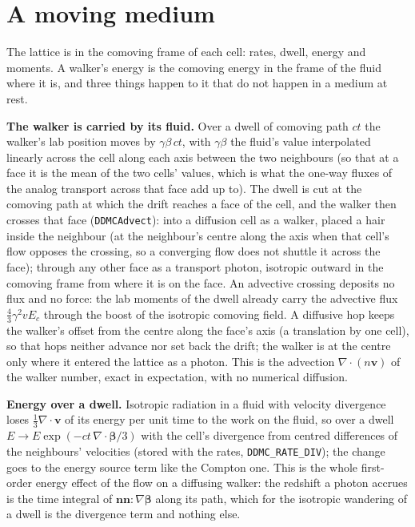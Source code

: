 \documentclass[11pt]{article}
\begin{document}
\section{A moving medium}
\label{sec:moving}

The lattice is in the comoving frame of each cell: rates, dwell, energy and moments.
A walker's energy is the comoving energy in the frame of the fluid where it is, and
three things happen to it that do not happen in a medium at rest.

\textbf{The walker is carried by its fluid.}  Over a dwell of comoving path $ct$ the
walker's lab position moves by $\gamma\beta\,ct$, with $\gamma\beta$ the fluid's value
interpolated linearly across the cell along each axis between the two neighbours (so
that at a face it is the mean of the two cells' values, which is what the one-way
fluxes of the analog transport across that face add up to).  The dwell is cut at the
comoving path at which the drift reaches a face of the cell, and the walker then
crosses that face (\texttt{DDMCAdvect}): into a diffusion cell as a walker, placed a
hair inside the neighbour (at the neighbour's centre along the axis when that cell's
flow opposes the crossing, so a converging flow does not shuttle it across the face);
through any other face as a transport photon, isotropic outward in the comoving frame
from where it is on the face.  An advective crossing deposits no flux and no force: the
lab moments of the dwell already carry the advective flux $\tfrac{4}{3}\gamma^2 v E_c$
through the boost of the isotropic comoving field.  A diffusive hop keeps the walker's
offset from the centre along the face's axis (a translation by one cell), so that hops
neither advance nor set back the drift; the walker is at the centre only where it
entered the lattice as a photon.  This is the advection $\nabla\cdot(n\boldsymbol{v})$
of the walker number, exact in expectation, with no numerical diffusion.

\textbf{Energy over a dwell.}  Isotropic radiation in a fluid with velocity divergence
loses $\tfrac{1}{3}\nabla\cdot\boldsymbol{v}$ of its energy per unit time to the work
on the fluid, so over a dwell $E \to E\exp(-ct\,\nabla\cdot\boldsymbol{\beta}/3)$ with
the cell's divergence from centred differences of the neighbours' velocities (stored
with the rates, \texttt{DDMC\_RATE\_DIV}); the change goes to the energy source term
like the Compton one.  This is the whole first-order energy effect of the flow on a
diffusing walker: the redshift a photon accrues is the time integral of
$\boldsymbol{n}\boldsymbol{n}\!:\!\nabla\boldsymbol{\beta}$ along its path, which for the
isotropic wandering of a dwell is the divergence term and nothing else.
\end{document}
